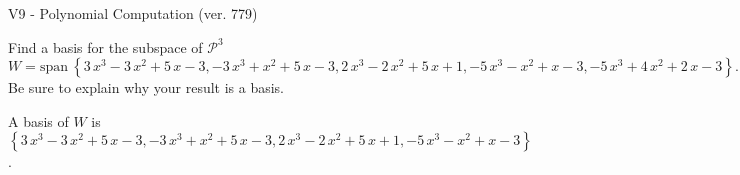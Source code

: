 \begin{exercise}
  \begin{exerciseTitle}V9 - Polynomial Computation (ver. 779)\end{exerciseTitle}
  \begin{exerciseStatement}
    Find a basis for the subspace of \(\mathcal{P}^3\) 
\[W=\mathrm{span}\ \left\{3 \, x^{3} - 3 \, x^{2} + 5 \, x - 3 , -3 \, x^{3} + x^{2} + 5 \, x - 3 , 2 \, x^{3} - 2 \, x^{2} + 5 \, x + 1 , -5 \, x^{3} - x^{2} + x - 3 , -5 \, x^{3} + 4 \, x^{2} + 2 \, x - 3\right\}.\]
 Be sure to explain why your result is a basis.


  \end{exerciseStatement}
  \begin{exerciseAnswer}
   A basis of \(W\) is  \(\left\{3 \, x^{3} - 3 \, x^{2} + 5 \, x - 3 , -3 \, x^{3} + x^{2} + 5 \, x - 3 , 2 \, x^{3} - 2 \, x^{2} + 5 \, x + 1 , -5 \, x^{3} - x^{2} + x - 3\right\}\).
  


  \end{exerciseAnswer}
\end{exercise}